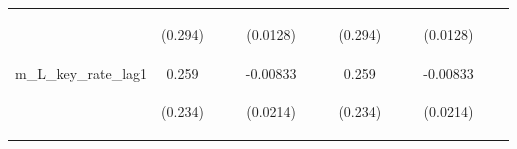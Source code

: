\documentclass[]{article}
\begin{document}
\begin{center}
\begin{tabular}{lcccccccccccc}
\vspace{4pt} & \begin{footnotesize}(0.294)\end{footnotesize} & \begin{footnotesize}\end{footnotesize} & \begin{footnotesize}\end{footnotesize} & \begin{footnotesize}(0.0128)\end{footnotesize} & \begin{footnotesize}\end{footnotesize} & \begin{footnotesize}\end{footnotesize} & \begin{footnotesize}(0.294)\end{footnotesize} & \begin{footnotesize}\end{footnotesize} & \begin{footnotesize}\end{footnotesize} & \begin{footnotesize}(0.0128)\end{footnotesize} & \begin{footnotesize}\end{footnotesize} & \begin{footnotesize}\end{footnotesize} \\
m\_L\_key\_rate\_lag1 & 0.259 &  &  & -0.00833 &  &  & 0.259 &  &  & -0.00833 &  &  \\
\vspace{4pt} & \begin{footnotesize}(0.234)\end{footnotesize} & \begin{footnotesize}\end{footnotesize} & \begin{footnotesize}\end{footnotesize} & \begin{footnotesize}(0.0214)\end{footnotesize} & \begin{footnotesize}\end{footnotesize} & \begin{footnotesize}\end{footnotesize} & \begin{footnotesize}(0.234)\end{footnotesize} & \begin{footnotesize}\end{footnotesize} & \begin{footnotesize}\end{footnotesize} & \begin{footnotesize}(0.0214)\end{footnotesize} & \begin{footnotesize}\end{footnotesize} & \begin{footnotesize}\end{footnotesize} \\

\end{tabular}
\end{center}
\end{document}
